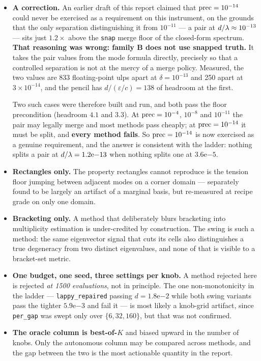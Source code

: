 \begin{itemize}
\item \textbf{A correction.} An earlier draft of this report claimed that
$\mathrm{prec} = 10^{-14}$ could never be exercised as a requirement on this instrument, on the grounds
that the only separation distinguishing it from $10^{-11}$ --- a pair at
$d/\lambda \approx 10^{-13}$ --- sits just $1.2\times$ above the \texttt{snap} merge floor of the
closed-form spectrum. \textbf{That reasoning was wrong: family B does not use snapped truth.} It
takes the pair values from the mode formula directly, precisely so that a controlled separation
is not at the mercy of a merge policy. Measured, the two values are 833 floating-point ulps
apart at $\delta = 10^{-13}$ and 250 apart at $3 \times 10^{-14}$, and the pencil has
$d/(\varepsilon/c) = 138$ of headroom at the first.

Two such cases were therefore built and run, and both pass the floor precondition (headroom
$4.1$ and $3.3$). At $\mathrm{prec} = 10^{-4}$, $10^{-8}$ and $10^{-11}$ the pair may legally merge and
most methods pass cheaply; at $\mathrm{prec} = 10^{-14}$ it must be split, and \textbf{every method
fails}. So $\mathrm{prec} = 10^{-14}$ is now exercised as a genuine requirement, and the answer is
consistent with the ladder: nothing splits a pair at $d/\lambda = 1.2\mathrm{e}{-13}$ when nothing
splits one at $3.6\mathrm{e}{-5}$.

\item \textbf{Rectangles only.} The property rectangles cannot reproduce is the tension floor
jumping between adjacent modes on a corner domain --- separately found to be largely an
artifact of a marginal basis, but re-measured at recipe grade on only one domain.

\item \textbf{Bracketing only.} A method that deliberately blurs bracketing into multiplicity
estimation is under-credited by construction. The swing is such a method: the same eigenvector
signal that cuts its cells also distinguishes a true degeneracy from two distinct eigenvalues,
and none of that is visible to a bracket-set metric.

\item \textbf{One budget, one seed, three settings per knob.} A method rejected here is
rejected \emph{at 1500 evaluations}, not in principle. The one non-monotonicity in the ladder
--- \texttt{lappy\_repaired} passing $d = 1.8\mathrm{e}{-2}$ while both swing variants pass the
tighter $5.9\mathrm{e}{-3}$ and fail it --- is most likely a knob-grid artifact, since
\texttt{per\_gap} was swept only over $\{6, 32, 160\}$, but that was not confirmed.

\item \textbf{The oracle column is best-of-$K$} and biased upward in the number of knobs. Only
the autonomous column may be compared across methods, and the gap between the two is the most
actionable quantity in the report.
\end{itemize}
